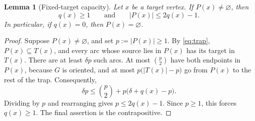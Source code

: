 \documentclass[10pt,a4paper]{amsart}
\newtheorem{lemma}[theorem]{Lemma}
\begin{document}
\begin{lemma}[Fixed-target capacity]\label{lem:capacity}
Let $x$ be a target vertex.  If $P(x)\ne\varnothing$, then
\[
 q(x)\ge1
 \qquad\text{and}\qquad
 |P(x)|\le2q(x)-1.
\]
In particular, if $q(x)=0$, then $P(x)=\varnothing$.
\end{lemma}

\begin{proof}
Suppose $P(x)\ne\varnothing$, and set $p:=|P(x)|\ge1$.
By \eqref{eq:trap}, $P(x)\subseteq T(x)$, and every arc whose source lies in
$P(x)$ has its target in $T(x)$.
There are at least $\delta p$ such arcs.  At most
$\binom{p}{2}$ have both endpoints in $P(x)$, because $G$ is oriented, and at
most $p\bigl(|T(x)|-p\bigr)$ go from $P(x)$ to the rest of the trap.
Consequently,
\[
 \delta p
 \le \binom{p}{2}
    +p\bigl(\delta+q(x)-p\bigr).
\]
Dividing by $p$ and rearranging gives $p\le2q(x)-1$.  Since $p\ge1$, this
forces $q(x)\ge1$.  The final assertion is the contrapositive.
\end{proof}
\end{document}
